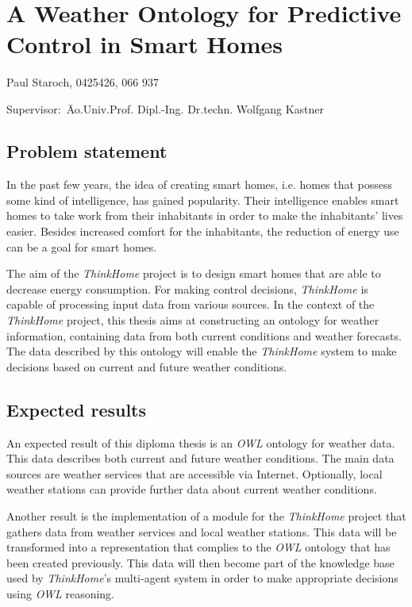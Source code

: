 \documentclass{scrartcl}
\begin{document}
~\vspace{0.5cm}
\section*{A Weather Ontology for Predictive Control in Smart Homes}
Paul Staroch, 0425426, 066 937
\begin{tabbing}
Supervisor:\ \= Ao.Univ.Prof. Dipl.-Ing. Dr.techn. Wolfgang Kastner\\
\end{tabbing}

\subsection*{Problem statement}
In the past few years, the idea of creating smart homes, i.e. homes that possess some kind of intelligence, has gained popularity. Their intelligence enables smart homes to take work from their inhabitants in order to make the inhabitants' lives easier. Besides increased comfort for the inhabitants, the reduction of energy use can be a goal for smart homes.

The aim of the \textit{ThinkHome} project \cite{CR2011-TH_Journal} \cite{CR2010-DEST_ThinkHome} is to design smart homes that are able to decrease energy consumption. For making control decisions, \textit{ThinkHome} is capable of processing input data from various sources. In the context of the \textit{ThinkHome} project, this thesis aims at constructing an ontology for weather information, containing data from both current conditions and weather forecasts. The data described by this ontology will enable the \textit{ThinkHome} system to make decisions based on current and future weather conditions.

\subsection*{Expected results}
An expected result of this diploma thesis is an \textit{OWL} ontology for weather data. This data describes both current and future weather conditions. The main data sources are weather services that are accessible via Internet. Optionally, local weather stations can provide further data about current weather conditions.

Another result is the implementation of a module for the \textit{ThinkHome} project that gathers data from weather services and local weather stations. This data will be transformed into a representation that complies to the \textit{OWL} ontology that has been created previously. This data will then become part of the knowledge base used by \textit{ThinkHome}'s multi-agent system in order to make appropriate decisions using \textit{OWL} reasoning.
\end{document}
